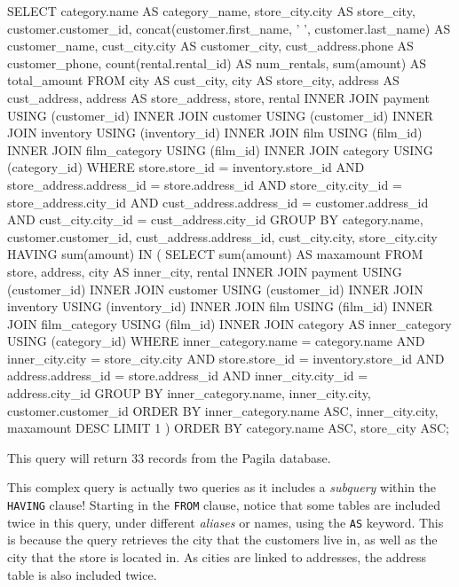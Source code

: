 \begin{sqlcode}
SELECT category.name AS category_name, 
       store_city.city AS store_city,
       customer.customer_id, 
       concat(customer.first_name, ' ', 
           customer.last_name) AS customer_name,
       cust_city.city AS customer_city,
       cust_address.phone AS customer_phone,
       count(rental.rental_id) AS num_rentals,
       sum(amount) AS total_amount
 FROM city AS cust_city, city AS store_city, 
      address AS cust_address, address AS store_address, 
      store, rental
 INNER JOIN payment USING (customer_id)
 INNER JOIN customer USING (customer_id)
 INNER JOIN inventory USING (inventory_id)
 INNER JOIN film USING (film_id)
 INNER JOIN film_category USING (film_id)
 INNER JOIN category USING (category_id)
 WHERE store.store_id = inventory.store_id
   AND store_address.address_id = store.address_id
   AND store_city.city_id = store_address.city_id
   AND cust_address.address_id = customer.address_id
   AND cust_city.city_id = cust_address.city_id
 GROUP BY category.name, customer.customer_id, 
         cust_address.address_id, cust_city.city, store_city.city
 HAVING sum(amount) IN (
  SELECT sum(amount) AS maxamount
   FROM store, address, city AS inner_city, rental
   INNER JOIN payment USING (customer_id)
   INNER JOIN customer USING (customer_id)
   INNER JOIN inventory USING (inventory_id)
   INNER JOIN film USING (film_id)
   INNER JOIN film_category USING (film_id)
   INNER JOIN category AS inner_category USING (category_id)
   WHERE inner_category.name = category.name AND
         inner_city.city = store_city.city AND
         store.store_id = inventory.store_id AND
         address.address_id = store.address_id AND
         inner_city.city_id = address.city_id
   GROUP BY inner_category.name, inner_city.city, 
            customer.customer_id
   ORDER BY inner_category.name ASC, inner_city.city, 
            maxamount DESC
   LIMIT 1 )
 ORDER BY category.name ASC, store_city ASC;
\end{sqlcode}

This query will return 33 records from the Pagila database.

This complex query is actually two queries as it includes a \emph{subquery} within the \texttt{HAVING} clause! Starting in the \texttt{FROM} clause, notice that some tables are included twice in this query, under different \emph{aliases} or names, using the \texttt{AS} keyword. This is because the query retrieves the city that the customers live in, as well as the city that the store is located in. As cities are linked to addresses, the address table is also included twice. 

